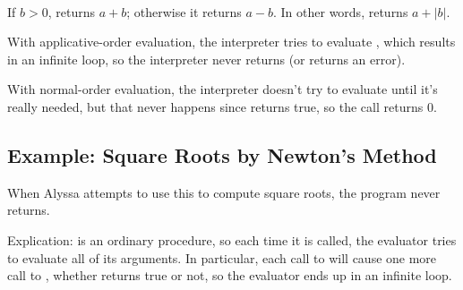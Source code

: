 \begin{exe}[1.3]
    \ \vspace{-20pt}
\end{exe}

\begin{exe}[1.4]
    If $b > 0$,  returns $a + b$; otherwise it returns 
    $a - b$. In other words,  returns $a + |b|$.
\end{exe}

\begin{exe}[1.5]
    With applicative-order evaluation, the interpreter tries to evaluate 
    , which results in an infinite loop, so the interpreter never 
    returns (or returns an error).

    With normal-order evaluation, the interpreter doesn't try to evaluate 
     until it's really needed, but that never happens since
     returns true, so the call returns 0.
\end{exe}

\subsection{Example: Square Roots by Newton’s Method}

\begin{exe}[1.6]
    When Alyssa attempts to use this to compute square roots, the program never 
    returns.

    Explication:  is an ordinary procedure, so each time it is 
    called, the evaluator tries to evaluate all of its arguments. In particular, 
    each call to  will cause one more call to , 
    whether  returns true or not, so the evaluator 
    ends up in an infinite loop.
\end{exe}


